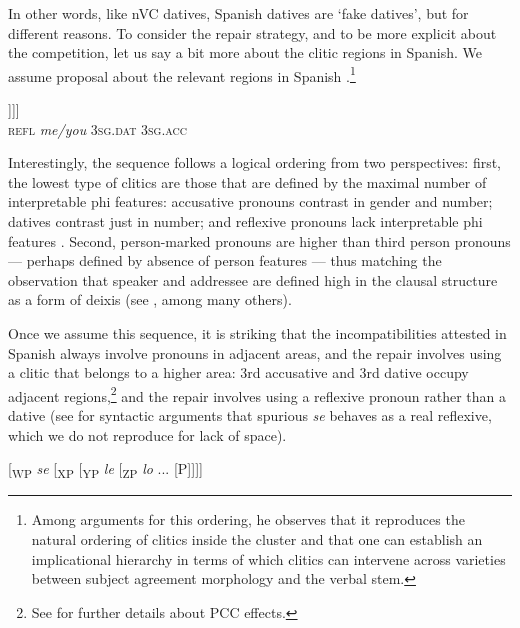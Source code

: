 \documentclass[output=paper,modfonts,nonflat,newtxmath,colorlinks,citecolor=brown]{langsci/langscibook}
\begin{document}
In other words, like nVC datives, Spanish datives are `fake datives', but for different reasons. To consider the repair strategy, and to be more explicit about the competition, let us say a bit more about the clitic regions in Spanish. We assume  proposal about the relevant regions in Spanish .\footnote{Among  arguments for this ordering, he observes that it reproduces the natural ordering of clitics inside the cluster and that one can establish an implicational hierarchy in terms of which clitics can intervene across varieties between subject agreement morphology and the verbal stem.}

\ea%
    \label{ex:cabre:22}
    \gll  [\textsubscript{WP}  \textit{se}  [\textsubscript{XP}  \textit{me/te}  [\textsubscript{YP}  \textit{le}  [\textsubscript{ZP}  \textit{lo} ... [{\liv}P]]]] \\
    { } \textsc{refl} { } \textit{me/you} {} \textsc{3sg.dat} { } \textsc{3sg.acc}  \\
    \glt
    \z



Interestingly, the sequence follows a logical ordering from two perspectives: first, the lowest type of clitics are those that are defined by the maximal number of interpretable phi features: accusative pronouns contrast in gender and number; datives contrast just in number; and reflexive pronouns lack interpretable phi features \citep{Reuland2011}. Second, person{}-marked pronouns are higher than third person pronouns — perhaps defined by absence of person features — thus matching the observation that speaker and addressee are defined high in the clausal structure as a form of deixis (see \citealt{Giorgi2009}, among many others).

Once we assume this sequence, it is striking that the incompatibilities attested in Spanish always involve pronouns in adjacent areas, and the repair involves using a clitic that belongs to a higher area: 3rd accusative and 3rd dative occupy adjacent regions,\footnote{See  for further details about PCC effects.} and the repair involves using a reflexive pronoun rather than a dative (see \citealt{Alcaraz2017} for syntactic arguments that spurious \textit{se} behaves as a real reflexive, which we do not reproduce for lack of space).

\ea  %
   {[}\textsubscript{WP}  \textit{se}  [\textsubscript{XP}  [\textsubscript{YP}  \textit{le}  [\textsubscript{ZP}  \textit{lo} ... [{\liv}P]{]]]}
\end{document}
